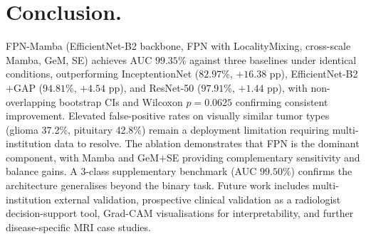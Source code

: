 \documentclass[runningheads]{llncs}
\begin{document}
\section{Conclusion.}
FPN-Mamba (EfficientNet-B2 backbone, FPN with LocalityMixing, cross-scale Mamba, GeM, SE) achieves AUC $99.35\%$ against three baselines under identical conditions, outperforming InceptentionNet ($82.97\%$, $+16.38$ pp), EfficientNet-B2$+$GAP ($94.81\%$, $+4.54$ pp), and ResNet-50 ($97.91\%$, $+1.44$ pp), with non-overlapping bootstrap CIs and Wilcoxon $p{=}0.0625$ confirming consistent improvement. Elevated false-positive rates on visually similar tumor types (glioma 37.2\%, pituitary 42.8\%) remain a deployment limitation requiring multi-institution data to resolve. The ablation demonstrates that FPN is the dominant component, with Mamba and GeM$+$SE providing complementary sensitivity and balance gains. A 3-class supplementary benchmark (AUC $99.50\%$) confirms the architecture generalises beyond the binary task. Future work includes multi-institution external validation, prospective clinical validation as a radiologist decision-support tool, Grad-CAM visualisations for interpretability, and further disease-specific MRI case studies.
\end{document}
